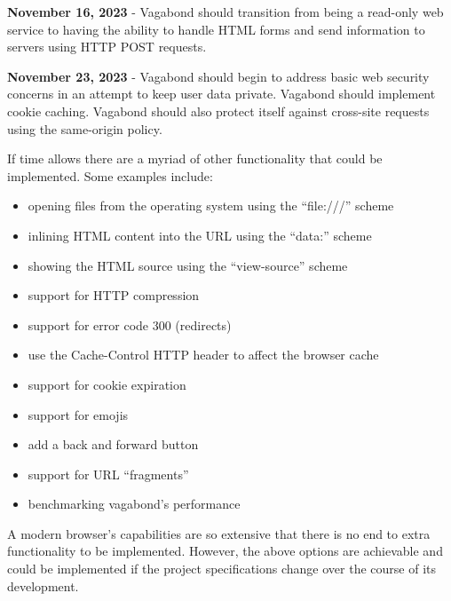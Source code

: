 \documentclass[12pt]{article}
\begin{document}
\textbf{November 16, 2023} - Vagabond should transition from being a read-only web service to having the ability to handle HTML forms and send information to servers using HTTP POST requests.

\textbf{November 23, 2023} - Vagabond should begin to address basic web security concerns in an attempt to keep user data private.  Vagabond should implement cookie caching.  Vagabond should also protect itself against cross-site requests using the same-origin policy.

If time allows there are a myriad of other functionality that could be implemented. Some examples include:
\begin{itemize}
\item opening files from the operating system using the “file:///” scheme
\item inlining HTML content into the URL using the “data:” scheme
\item showing the HTML source using the “view-source” scheme
\item support for HTTP compression
\item support for error code 300 (redirects)
\item use the Cache-Control HTTP header to affect the browser cache
\item support for cookie expiration
\item support for emojis
\item add a back and forward button
\item support for URL “fragments”
\item benchmarking vagabond’s performance
\end{itemize}

A modern browser’s capabilities are so extensive that there is no end to extra functionality to be implemented.  However, the above options are achievable and could be implemented if the project specifications change over the course of its development.




\vfill
\end{document}
